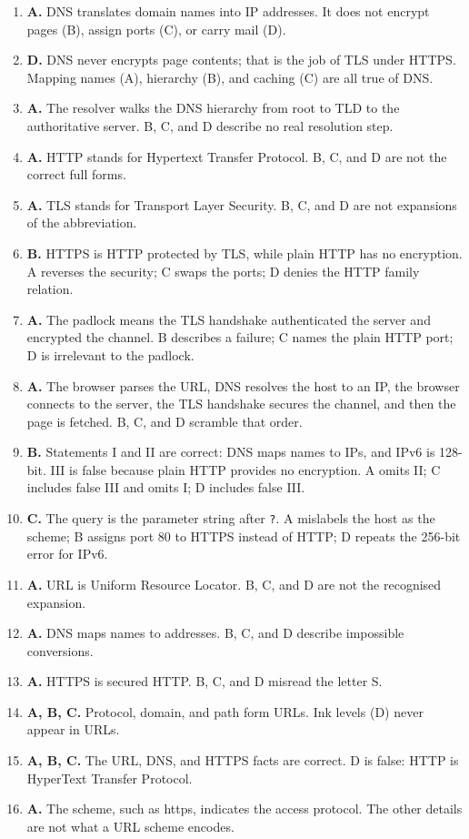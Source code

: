 \begin{enumerate}[label=\textbf{Q\arabic*.}, leftmargin=*]
  IPv6.
\item \textbf{A.} DNS translates domain names into IP addresses. It does not
  encrypt pages (B), assign ports (C), or carry mail (D).
\item \textbf{D.} DNS never encrypts page contents; that is the job of TLS
  under HTTPS. Mapping names (A), hierarchy (B), and caching (C) are all
  true of DNS.
\item \textbf{A.} The resolver walks the DNS hierarchy from root to TLD to
  the authoritative server. B, C, and D describe no real resolution step.
\item \textbf{A.} HTTP stands for Hypertext Transfer Protocol. B, C, and D
  are not the correct full forms.
\item \textbf{A.} TLS stands for Transport Layer Security. B, C, and D are
  not expansions of the abbreviation.
\item \textbf{B.} HTTPS is HTTP protected by TLS, while plain HTTP has no
  encryption. A reverses the security; C swaps the ports; D denies the
  HTTP family relation.
\item \textbf{A.} The padlock means the TLS handshake authenticated the
  server and encrypted the channel. B describes a failure; C names the plain
  HTTP port; D is irrelevant to the padlock.
\item \textbf{A.} The browser parses the URL, DNS resolves the host to an
  IP, the browser connects to the server, the TLS handshake secures the
  channel, and then the page is fetched. B, C, and D scramble that order.
\item \textbf{B.} Statements I and II are correct: DNS maps names to IPs,
  and IPv6 is 128-bit. III is false because plain HTTP provides no
  encryption. A omits II; C includes false III and omits I; D includes false
  III.
\item \textbf{C.} The query is the parameter string after \texttt{?}. A
  mislabels the host as the scheme; B assigns port 80 to HTTPS instead of
  HTTP; D repeats the 256-bit error for IPv6.

\item \textbf{A.} URL is Uniform Resource Locator. B, C, and D are not the recognised expansion.
\item \textbf{A.} DNS maps names to addresses. B, C, and D describe impossible conversions.
\item \textbf{A.} HTTPS is secured HTTP. B, C, and D misread the letter S.
\item \textbf{A, B, C.} Protocol, domain, and path form URLs. Ink levels (D) never appear in URLs.
\item \textbf{A, B, C.} The URL, DNS, and HTTPS facts are correct. D is false: HTTP is HyperText Transfer Protocol.
\item \textbf{A.} The scheme, such as https, indicates the access protocol. The other details are not what a URL scheme encodes.


\end{enumerate}
